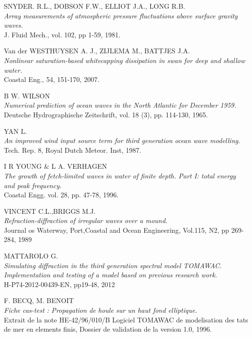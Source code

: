 \begin{thebibliography}{99}
 {\sc  SNYDER. R.L., DOBSON F.W., ELLIOT J.A., LONG R.B.}\\
{\em Array measurements of atmospheric pressure fluctuations above surface gravity waves.}\\ 
 J. Fluid Mech., vol. 102, pp 1-59, 1981.

 {\sc  Van der WESTHUYSEN A. J., ZIJLEMA M., BATTJES J.A.}\\
{\em Nonlinear saturation-based whitecapping dissipation in swan for deep and shallow water.}\\
 Coastal Eng., 54, 151-170, 2007.

 {\sc B W. WILSON}\\
{\em Numerical prediction of ocean waves in the North Atlantic for December 1959.}\\
 Deutsche Hydrographische Zeitschrift, vol. 18 (3), pp. 114-130, 1965.

 {\sc YAN L. }\\
{\em An improved wind input source term for third generation ocean wave modelling.}\\
 Tech. Rep. 8, Royal Dutch Meteor. Inst, 1987.

 {\sc  I R YOUNG \& L A. VERHAGEN}\\
{\em The growth of fetch-limited waves in water of finite depth. Part I: total energy and peak frequency.}\\
 Coastal Engg. vol. 28, pp. 47-78, 1996.

 {\sc   VINCENT C.L.,BRIGGS M.J.}\\
{\em Refraction-diffraction of irregular waves over a mound. }\\
Journal os Waterway, Port,Coastal and Ocean Engineering, Vol.115, N2, pp 269-284, 1989

 {\sc   MATTAROLO G.}\\
{\em  Simulating diffraction in the third generation spectral model TOMAWAC. Implementation and testing of a model based on previous research work. }\\
H-P74-2012-00439-EN, pp19-48, 2012

 {\sc    F. BECQ, M. BENOIT }\\
{\em Fiche cas-test : Propagation de houle sur un haut fond elliptique.}\\
Extrait de la note HE-42/96/010/B Logiciel TOMAWAC de modelisation des tats de mer en elements finis, Dossier de validation de la version 1.0, 1996. 


\end{thebibliography}
